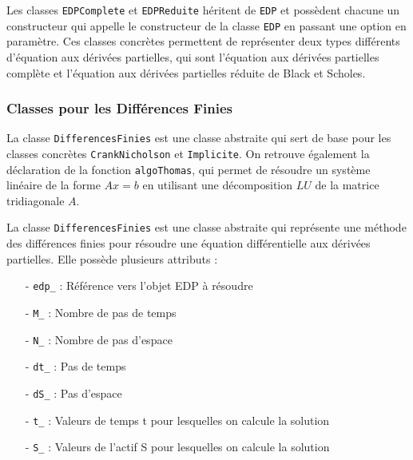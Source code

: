 \documentclass[11pt,a4paper]{article}
\begin{document}
\vspace{0.5cm}

Les classes \verb|EDPComplete| et \verb|EDPReduite| héritent de \verb|EDP| et possèdent chacune un constructeur qui appelle le constructeur de la classe \verb|EDP| en passant une option en paramètre. Ces classes concrètes permettent de représenter deux types différents d'équation aux dérivées partielles, qui sont l'équation aux dérivées partielles complète et l'équation aux dérivées partielles réduite de Black et Scholes.

\newpage

\subsubsection{Classes pour les Différences Finies}

La classe \verb|DifferencesFinies| est une classe abstraite qui sert de base pour les classes concrètes \verb|CrankNicholson| et \verb|Implicite|. On retrouve également la déclaration de la fonction \verb|algoThomas|, qui permet de résoudre un système linéaire de la forme $Ax = b$ en utilisant une décomposition $LU$ de la matrice tridiagonale $A$.

\vspace{0.5cm}

La classe \verb|DifferencesFinies| est une classe abstraite qui représente une méthode des différences finies pour résoudre une équation différentielle aux dérivées partielles. Elle possède plusieurs attributs : 

\vspace{0.5cm}

\begin{itemize}
    \item[-] \verb|edp_| : Référence vers l'objet EDP à résoudre
    \item[-] \verb|M_| : Nombre de pas de temps
    \item[-] \verb|N_| : Nombre de pas d'espace
    \item[-] \verb|dt_| : Pas de temps
    \item[-] \verb|dS_| : Pas d'espace
    \item[-] \verb|t_| : Valeurs de temps t pour lesquelles on calcule la solution
    \item[-] \verb|S_| :  Valeurs de l'actif S pour lesquelles on calcule la solution
\end{itemize}

\vspace{0.5cm}
\end{document}
